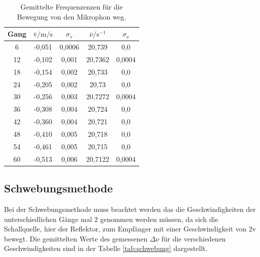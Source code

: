 \begin{table}
  \centering
  \caption{Gemittelte Frequenzenzen für die Bewegung von den Mikrophon weg.}
  \label{tab:rückwärts}
  \begin{tabular}{c c c c c}
    \toprule
Gang &  $\overline{\text{v}}/\si{\meter\per\second}$ & $\sigma_{\text{v}}$
 & $\overline{\nu}/\si{\second\tothe{-1}}$ & $\sigma_{\nu}$\\
    \midrule
    6  & -0,051 & 0,0006   & 20,739  & 0,0\\
    12 & -0,102 & 0,001    & 20,7362 & 0,0004\\
    18 & -0,154 & 0,002    & 20,733  & 0,0\\
    24 & -0,205 & 0,002    & 20,73   & 0,0\\
    30 & -0,256 & 0,003    & 20,7272 & 0,0004\\
    36 & -0,308 & 0,004    & 20,724  & 0,0\\
    42 & -0,360 & 0,004    & 20,721  & 0,0\\
    48 & -0,410 & 0,005    & 20,718  & 0,0\\
    54 & -0,461 & 0,005    & 20,715  & 0,0\\
    60 & -0,513 & 0,006    & 20,7122 & 0,0004\\

    \bottomrule
  \end{tabular}
\end{table}


\subsection{Schwebungsmethode}
Bei der Schwebungsmethode muss beachtet werden das die
Geschwindigkeiten der unterschiedlichen Gänge mal 2
genommen werden müssen, da sich die Schallquelle,
hier der Reflektor,
zum Empfänger mit einer Geschwindigkeit
von 2v bewegt. Die gemittelten Werte des gemessenen $\Delta\nu$
für die verschiedenen Geschwindigkeiten
sind in der Tabelle \ref{tab:schwebung} dargestellt.

